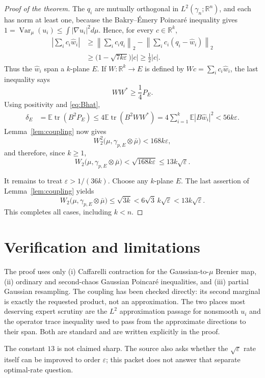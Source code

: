 \documentclass[11pt]{article}
\newcommand{\R}{\mathbb R}
\newcommand{\E}{\mathbb E}
\newcommand{\Var}{\operatorname{Var}}
\newcommand{\tr}{\operatorname{tr}}
\begin{document}
\begin{proof}[Proof of the theorem]
The $q_i$ are mutually orthogonal in $L^2(\gamma_n;\R^n)$, and each has norm
at least one, because the Bakry--\'Emery Poincar\'e inequality gives
$1=\Var_\mu(u_i)\le\int|\nabla u_i|^2d\mu$.  Hence, for every
$c\in\R^k$,
\begin{align*}
 \left|\sum_i c_i\widehat w_i\right|
 &\ge \left\|\sum_i c_iq_i\right\|_2
      -\left\|\sum_i c_i(q_i-\widehat w_i)\right\|_2\\
 &\ge\bigl(1-\sqrt{7k\varepsilon}\bigr)|c|
 \ge\frac12|c|.
\end{align*}
Thus the $\widehat w_i$ span a $k$-plane $E$.  If
$W:\R^k\to E$ is defined by $Wc=\sum_i c_i\widehat w_i$, the last inequality
says
\[
 WW^*\ge\frac14P_E.
\]
Using positivity and \eqref{eq:Bhat},
\begin{align*}
 \delta_E
 &=\E\tr(B^2P_E)
 \le4\E\tr(B^2WW^*)
 =4\sum_{i=1}^k\E|B\widehat w_i|^2
 <56k\varepsilon.
\end{align*}
Lemma~\ref{lem:coupling} now gives
\[
 W_2^2\bigl(\mu,\gamma_{p,E}\otimes\bar\mu\bigr)
 <168k\varepsilon,
\]
and therefore, since $k\ge1$,
\[
 W_2\bigl(\mu,\gamma_{p,E}\otimes\bar\mu\bigr)
 <\sqrt{168k\varepsilon}\le13k\sqrt\varepsilon.
\]

It remains to treat $\varepsilon>1/(36k)$.  Choose any $k$-plane $E$.
The last assertion of Lemma~\ref{lem:coupling} yields
\[
 W_2\bigl(\mu,\gamma_{p,E}\otimes\bar\mu\bigr)\le\sqrt{3k}
 <6\sqrt3\,k\sqrt\varepsilon<13k\sqrt\varepsilon.
\]
This completes all cases, including $k<n$.
\end{proof}

\section{Verification and limitations}

The proof uses only (i) Caffarelli contraction for the Gaussian-to-$\mu$
Brenier map, (ii) ordinary and second-chaos Gaussian Poincar\'e inequalities,
and (iii) partial Gaussian resampling.  The coupling has been checked directly:
its second marginal is exactly the requested product, not an approximation.
The two places most deserving expert scrutiny are the $L^2$ approximation
passage for nonsmooth $u_i$ and the operator trace inequality used to pass from
the approximate directions to their span.  Both are standard and are written
explicitly in the proof.

The constant $13$ is not claimed sharp.  The source also asks whether the
$\sqrt\varepsilon$ rate itself can be improved to order $\varepsilon$; this
packet does not answer that separate optimal-rate question.
\end{document}
